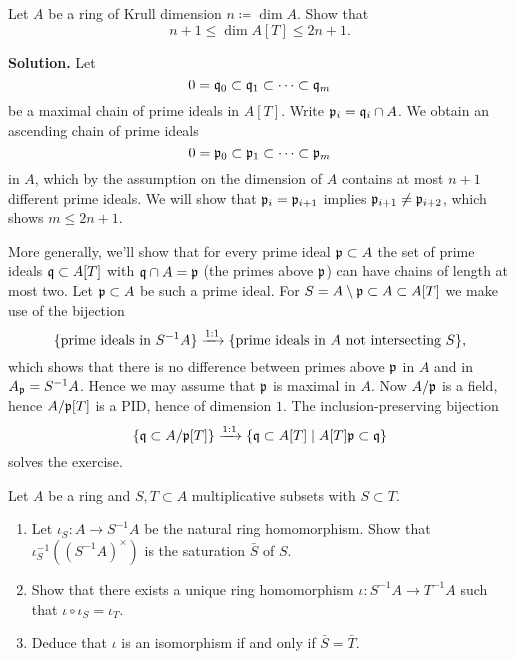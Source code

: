 \documentclass[a4paper,11pt]{article}
\begin{document}
    Let $A$ be a ring of Krull dimension $n \coloneqq \dim A$. Show that 
    \begin{equation*}
        n+1 \leq \dim A[T] \leq 2n + 1.
    \end{equation*}

\textbf{Solution.}
Let $$0 = \mathfrak{q}_0 \subset \mathfrak{q}_1 \subset \dots \subset \mathfrak{q}_m$$ be a maximal chain of 
prime ideals in $A[T]$. Write $\mathfrak{p}_i = \mathfrak{q}_i \cap A$. We obtain an ascending chain
of prime ideals 
\begin{equation*}
    0 = \mathfrak{p}_0 \subset \mathfrak{p}_1 \subset \dots \subset \mathfrak{p}_m
\end{equation*}
in $A$, which by the assumption on the dimension of $A$ contains at most $n+1$
different prime ideals. We will show that $\mathfrak{p}_i = \mathfrak{p}_{i+1}$ implies
$\mathfrak{p}_{i+1} \neq \mathfrak{p}_{i+2}$, which shows $m \leq 2n + 1$. 

More generally, we'll show that for every prime ideal $\mathfrak{p} \subset A$ the set of
prime ideals $\mathfrak{q} \subset A[T]$ with $\mathfrak{q} \cap A = \mathfrak{p}$ (the primes above
$\mathfrak{p}$) can have chains of length at most two. Let $\mathfrak{p} \subset A$ be such a prime
ideal. For $S = A\setminus \mathfrak{p} \subset A \subset A[T]$ we make use
of the bijection
\begin{equation*}
    \{ \text{prime ideals in $S^{-1} A$} \} \xrightarrow{1:1} \{\text{prime ideals in $A$ not intersecting $S$} \},
\end{equation*}
which shows that there is no difference between primes above $\mathfrak{p}$ in $A$ and in 
$A_{\mathfrak{p}} = S^{-1}A$. 
Hence we may assume that $\mathfrak{p}$ is maximal in $A$. 
Now $A/\mathfrak{p}$ is a field, hence $A/\mathfrak{p}[T]$ is a PID, hence of dimension $1$. 
The inclusion-preserving bijection
\begin{equation*}
    \{\mathfrak{q} \subset A/\mathfrak{p}[T]\} \xrightarrow{1:1} \{\mathfrak{q} \subset A[T] \mid A[T]\mathfrak{p} \subset
    \mathfrak{q} \}
\end{equation*}
solves the exercise.

Let $A$ be a ring and $S, T \subset A$ multiplicative subsets with $S \subset T$. 
\begin{enumerate}
    \item Let $\iota_S : A \to S^{-1}A$ be the natural ring homomorphism. Show that 
        $\iota_S^{-1}((S^{-1} A)^\times)$ is the saturation $\bar S$ of $S$. 
    \item Show that there exists a unique ring homomorphism $\iota:  S^{-1}A \to
        T^{-1}A$ such that $\iota \circ \iota_S = \iota_T.$
    \item Deduce that $\iota$ is an isomorphism if and only if $\bar S = \bar T$. 
\end{enumerate}
\end{document}
